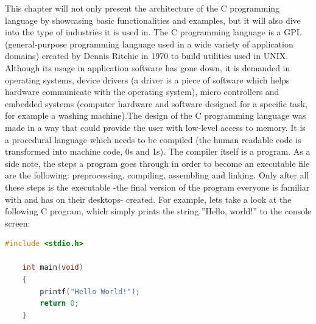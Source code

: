 \documentclass[12pt]{article}
\begin{document}
This chapter will not only present the architecture of the C programming language by showcasing basic functionalities and examples, but it will also dive into the type of industries it is used in.\newline\newline
The C programming language is a GPL (general-purpose programming language used in a wide variety of application domains) created by Dennis Ritchie in 1970 to build utilities used in UNIX. Although its usage in application software has gone down, it is demanded in operating systems, device drivers (a driver is a piece of software which helps hardware communicate with the operating system), micro controllers and embedded systems (computer hardware and software designed for a specific task, for example a washing machine).\newline\newline The design of the C programming language was made in a way that could provide the user with low-level access to memory. It is a procedural language which needs to be compiled (the human readable code is transformed into machine code, 0s and 1s). The compiler itself is a program. As a side note, the steps a program goes through in order to become an executable file are the following: preprocessing, compiling, assembling and linking. Only after all these steps is the executable -the final version of the program everyone is familiar with and has on their desktops- created. For example, lets take a look at the following C program, which simply prints the string ”Hello, world!” to the console screen:
\begin{center}
    \begin{lstlisting}[language=C]
    #include <stdio.h>
    
    int main(void)
    {
        printf("Hello World!");
        return 0;
    }
    \end{lstlisting}
\end{center}
\end{document}
